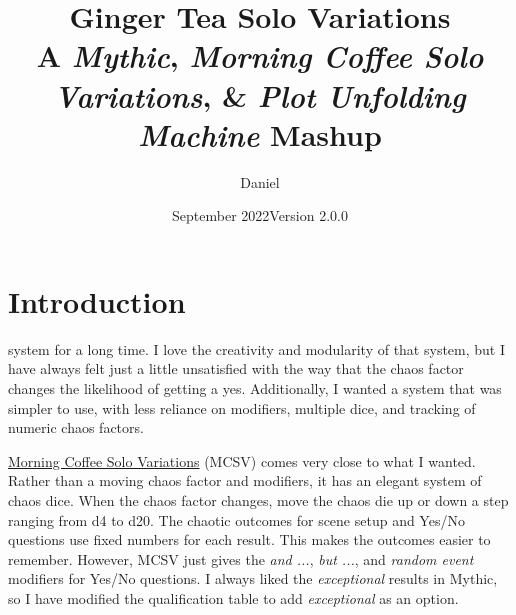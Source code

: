 

\title{
\Huge{Ginger Tea Solo Variations}
\\ \small{A \emph{Mythic}, \emph{Morning Coffee Solo Variations}, \& \emph{Plot Unfolding Machine} Mashup}
}
\date{September 2022\newline{}Version 2.0.0}
\author{Daniel}


\frontmatter
\maketitle


\mainmatter

\section{Introduction}
system for a long time. I love the creativity and modularity of that system,
but I have always felt just a little unsatisfied with the way that the chaos
factor changes the likelihood of getting a yes. Additionally, I wanted a system
that was simpler to use, with less reliance on modifiers, multiple dice, and
tracking of numeric chaos factors.

\href{https://aleaiactandaest.blogspot.com/p/downloads.html}{Morning Coffee Solo
Variations} (MCSV) comes very close to what I wanted. Rather than a moving chaos
factor and modifiers, it has an elegant system of chaos dice. When the chaos
factor changes, move the chaos die up or down a step ranging from d4 to d20. The
chaotic outcomes for scene setup and Yes/No questions use fixed numbers for each
result. This makes the outcomes easier to remember. However, MCSV just gives the
\emph{and ...}, \emph{but ...}, and \emph{random event} modifiers for Yes/No
questions. I always liked the \emph{exceptional} results in Mythic, so I have
modified the qualification table to add \emph{exceptional} as an option.

